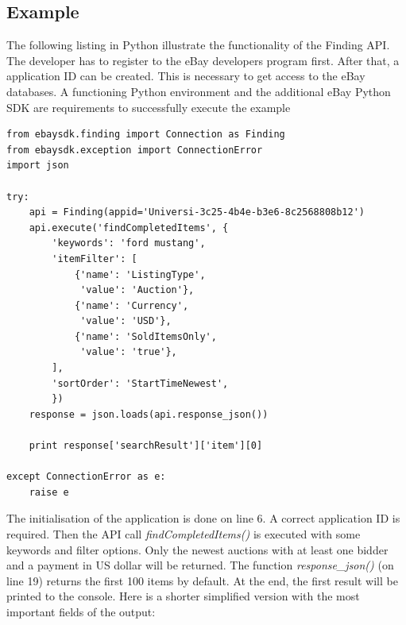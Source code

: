 \subsection{Example}
The following listing in Python illustrate the functionality of the Finding API. The developer has to register to the eBay developers program first. After that, a application ID can be created. This is necessary to get access to the eBay databases. A functioning Python environment and the additional eBay Python SDK are requirements to successfully execute the example
\begin{lstlisting}
from ebaysdk.finding import Connection as Finding
from ebaysdk.exception import ConnectionError
import json

try:
    api = Finding(appid='Universi-3c25-4b4e-b3e6-8c2568808b12')
    api.execute('findCompletedItems', {
        'keywords': 'ford mustang',
        'itemFilter': [
            {'name': 'ListingType',
             'value': 'Auction'},
            {'name': 'Currency',
             'value': 'USD'},                
            {'name': 'SoldItemsOnly',
             'value': 'true'},                 
        ],        
        'sortOrder': 'StartTimeNewest',
        })
    response = json.loads(api.response_json())
    
    print response['searchResult']['item'][0]
    
except ConnectionError as e:
    raise e  
\end{lstlisting}
The initialisation of the application is done on line 6. A correct application ID is required. Then the API call \textit{findCompletedItems()} is executed with some keywords and filter options. Only the newest auctions with at least one bidder and a payment in US dollar will be returned. The function \textit{response\_json()} (on line 19) returns the first 100 items by default. At the end, the first result will be printed to the console. Here is a shorter simplified version with the most important fields of the output:
